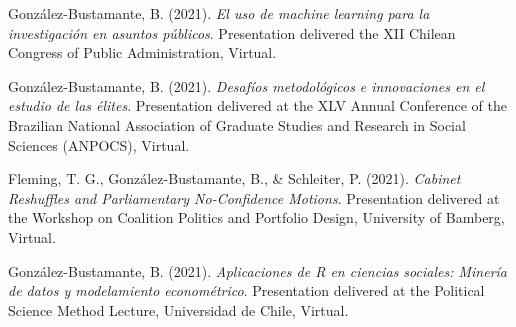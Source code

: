 \begin{publications}
\begin{benumerate}{87}

\item{González-Bustamante, B. (2021). {\itshape El uso de machine learning para la investigación en asuntos públicos}. Presentation delivered the XII Chilean Congress of Public Administration, Virtual.}\vspace{1mm}


\item{González-Bustamante, B. (2021). {\itshape Desafíos metodológicos e innovaciones en el estudio de las élites}. Presentation delivered at the XLV Annual Conference of the Brazilian National Association of Graduate Studies and Research in Social Sciences (ANPOCS), Virtual.}\vspace{1mm}

\item{Fleming, T. G., González-Bustamante, B., \& Schleiter, P. (2021). {\itshape Cabinet Reshuffles and Parliamentary No-Confidence Motions}. Presentation delivered at the Workshop on Coalition Politics and Portfolio Design, University of Bamberg, Virtual.}\vspace{1mm}


\item{González-Bustamante, B. (2021). {\itshape Aplicaciones de R en ciencias sociales: Minería de datos y modelamiento econométrico}. Presentation delivered at the Political Science Method Lecture, Universidad de Chile, Virtual.}\vspace{1mm}



\end{benumerate}
\end{publications}
